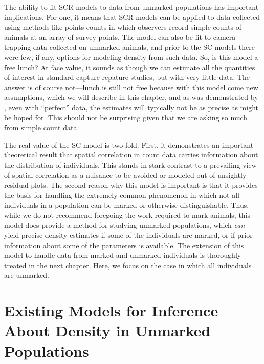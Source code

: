 The ability to fit SCR models to data from unmarked populations has
important implications. For one, it means that SCR models can
be applied to data collected using methods like points counts in which
observers record simple counts of animals at an array of survey
points. The model can also be fit to camera trapping data collected on
unmarked animals, and prior to the SC models
there were few, if any, options for modeling density from such data.
So, is this model a free lunch? At face value, it sounds as though we
can estimate all the quantities of interest in standard
capture-repature studies, but with very little
data. The answer is of course not---lunch is still not free because
with this model come new assumptions,
which we will describe in this chapter,
and as was demonstrated by
\citet{chandler_royle:2012}, even with ``perfect'' data, the estimates
will typically not be as precise as might be hoped for. This should
not be surprising given that we are asking so much from simple count
data.

The real value of the SC model is two-fold. First, it demonstrates
an important theoretical result %
that spatial correlation in
count data carries information about the distribution of
individuals. This stands in stark contrast to a prevailing view of
spatial correlation as a nuisance to be avoided or modeled out of unsightly
residual plots. The second reason why this model is important is that
it provides the basis for handling the extremely common phenomenon in
which not all individuals in a population can be marked or otherwise
distinguishable. Thus, while we do not recommend foregoing the work
required to mark animals, this model does provide a method for
studying unmarked populations, which \textit{can} yield precise
density estimates if some of the individuals are marked, or if prior
information about some of the parameters is available.
The extension of this model to handle data from marked and unmarked
individuals is thoroughly treated in the next chapter. Here, we focus
on the case in which all individuals are unmarked.

\section{Existing Models for Inference About Density in Unmarked Populations}
\label{Sect.existing-unmarked}

